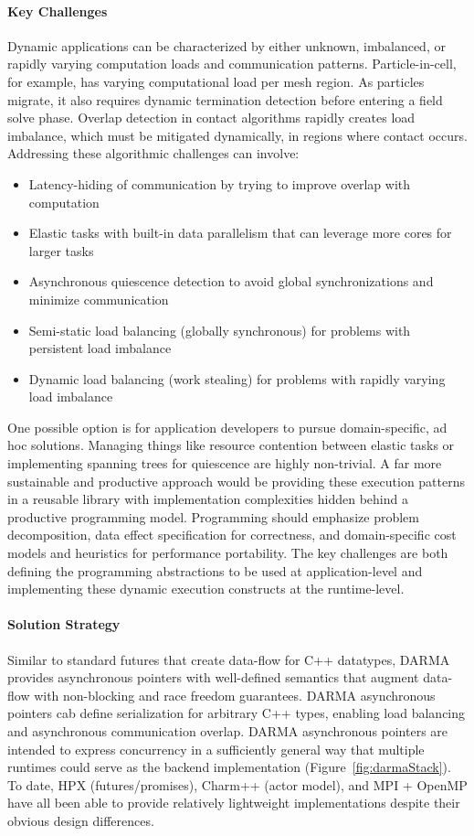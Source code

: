 \paragraph{Key Challenges}
Dynamic applications can be characterized by either unknown, imbalanced, or rapidly varying computation loads and communication patterns.
Particle-in-cell, for example, has varying computational load per mesh region. As particles migrate, it also requires dynamic termination detection before entering a field solve phase. 
Overlap detection in contact algorithms rapidly creates load imbalance, which must be mitigated dynamically, in regions where contact occurs. Addressing these algorithmic challenges can involve:
\begin{itemize}
\item Latency-hiding of communication by trying to improve overlap with computation
\item Elastic tasks with built-in data parallelism that can leverage more cores for larger tasks
\item Asynchronous quiescence detection to avoid global synchronizations and minimize communication
\item Semi-static load balancing (globally synchronous) for problems with persistent load imbalance
\item Dynamic load balancing (work stealing) for problems with rapidly varying load imbalance
\end{itemize}
One possible option is for application developers to pursue domain-specific, ad hoc solutions.
Managing things like resource contention between elastic tasks or implementing spanning trees for quiescence are highly non-trivial.
A far more sustainable and productive approach would be providing these execution patterns in a reusable library with implementation complexities hidden behind a productive programming model.
Programming should emphasize problem decomposition, data effect specification for correctness, and domain-specific cost models and heuristics for performance portability.
The key challenges are both defining the programming abstractions to be used at application-level and implementing these dynamic execution constructs at the runtime-level.

\paragraph{Solution Strategy}
Similar to standard futures that create data-flow for C++ datatypes,
DARMA provides asynchronous pointers with well-defined semantics that augment data-flow with non-blocking and race freedom guarantees.
DARMA asynchronous pointers cab define serialization for arbitrary C++ types, enabling load balancing and asynchronous communication overlap.
DARMA asynchronous pointers are intended to express concurrency in a sufficiently general way that multiple runtimes could serve as the backend implementation (Figure~\ref{fig:darmaStack}).
To date, HPX (futures/promises), Charm++ (actor model), and MPI + OpenMP have all been able to provide relatively lightweight implementations despite their obvious design differences.


